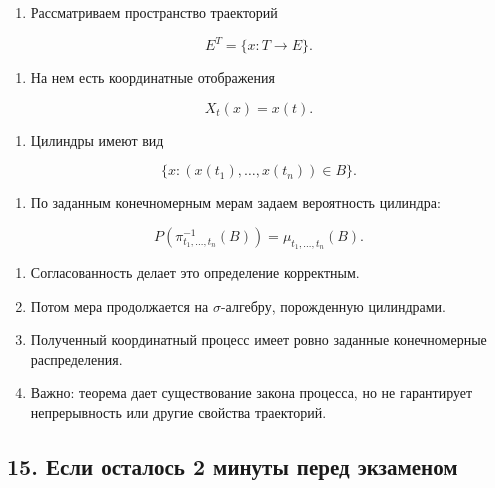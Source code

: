 \documentclass[
  11pt,
  a4paper,
]{article}
\providecommand{\tightlist}{%
  \setlength{\itemsep}{0pt}\setlength{\parskip}{0pt}}
\begin{document}
\begin{enumerate}
\def\labelenumi{\arabic{enumi}.}
\setcounter{enumi}{4}
\tightlist
\item
  Рассматриваем пространство траекторий
\end{enumerate}

\[
E^T=\{x:T\to E\}.
\]

\begin{enumerate}
\def\labelenumi{\arabic{enumi}.}
\setcounter{enumi}{5}
\tightlist
\item
  На нем есть координатные отображения
\end{enumerate}

\[
X_t(x)=x(t).
\]

\begin{enumerate}
\def\labelenumi{\arabic{enumi}.}
\setcounter{enumi}{6}
\tightlist
\item
  Цилиндры имеют вид
\end{enumerate}

\[
\{x:(x(t_1),\ldots,x(t_n))\in B\}.
\]

\begin{enumerate}
\def\labelenumi{\arabic{enumi}.}
\setcounter{enumi}{7}
\tightlist
\item
  По заданным конечномерным мерам задаем вероятность цилиндра:
\end{enumerate}

\[
P(\pi_{t_1,\ldots,t_n}^{-1}(B))
=
\mu_{t_1,\ldots,t_n}(B).
\]

\begin{enumerate}
\def\labelenumi{\arabic{enumi}.}
\setcounter{enumi}{8}
\tightlist
\item
  Согласованность делает это определение корректным.
\item
  Потом мера продолжается на \(\sigma\)-алгебру, порожденную цилиндрами.
\item
  Полученный координатный процесс имеет ровно заданные конечномерные
  распределения.
\item
  Важно: теорема дает существование закона процесса, но не гарантирует
  непрерывность или другие свойства траекторий.
\end{enumerate}

\subsection{15. Если осталось 2 минуты перед
экзаменом}\label{ux435ux441ux43bux438-ux43eux441ux442ux430ux43bux43eux441ux44c-2-ux43cux438ux43dux443ux442ux44b-ux43fux435ux440ux435ux434-ux44dux43aux437ux430ux43cux435ux43dux43eux43c}
\end{document}
